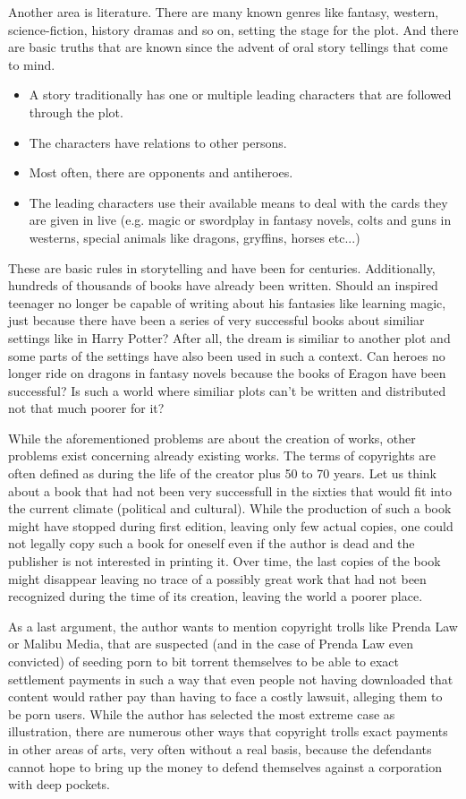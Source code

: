 \documentclass[a4paper]{report}
\begin{document}
Another area is literature. There are many known genres like fantasy, western, science-fiction, history dramas and so on, setting the stage for the plot. And there are basic truths that are known since the advent of oral story tellings that come to mind.
\begin{itemize}
	\item A story traditionally has one or multiple leading characters that are followed through the plot.
	\item The characters have relations to other persons.
	\item Most often, there are opponents and antiheroes.
	\item The leading characters use their available means to deal with the cards they are given in live (e.g. magic or swordplay in fantasy novels, colts and guns in westerns, special animals like dragons, gryffins, horses etc...)
\end{itemize} 
These are basic rules in storytelling and have been for centuries. Additionally, hundreds of thousands of books have already been written. Should an inspired teenager no longer be capable of writing about his fantasies like learning magic, just because there have been a series of very successful books about similiar settings like in Harry Potter? After all, the dream is similiar to another plot and some parts of the settings have also been used in such a context. Can heroes no longer ride on dragons in fantasy novels because the books of Eragon have been successful? Is such a world where similiar plots can't be written and distributed not that much poorer for it?

While the aforementioned problems are about the creation of works, other problems exist concerning already existing works. The terms of copyrights are often defined as during the life of the creator plus 50 to 70 years. Let us think about a book that had not been very successfull in the sixties that would fit into the current climate (political and cultural). While the production of such a book might have stopped during first edition, leaving only few actual copies, one could not legally copy such a book for oneself even if the author is dead and the publisher is not interested in printing it. Over time, the last copies of the book might disappear leaving no trace of a possibly great work that had not been recognized during the time of its creation, leaving the world a poorer place.

As a last argument, the author wants to mention copyright trolls like Prenda Law or Malibu Media, that are suspected (and in the case of Prenda Law even convicted) of seeding porn to bit torrent themselves to be able to exact settlement payments in such a way that even people not having downloaded that content would rather pay than having to face a costly lawsuit, alleging them to be porn users. While the author has selected the most extreme case as illustration, there are numerous other ways that copyright trolls exact payments in other areas of arts, very often without a real basis, because the defendants cannot hope to bring up the money to defend themselves against a corporation with deep pockets.
\end{document}
